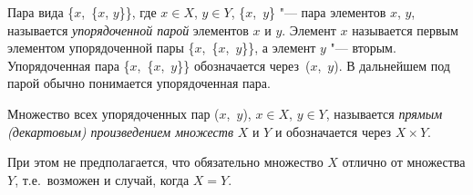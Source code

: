 \begin{defn}
Пара вида \{$x$,~\{$x$, $y$\}\}, где $x\in X$, $y\in Y$, \{$x$,~$y$\} "--- пара элементов $x$, $y$, называется \textit{упорядоченной парой} элементов $x$ и $y$. Элемент $x$ называется первым элементом упорядоченной пары \{$x$,~\{$x$,~$y$\}\}, а элемент $y$ "--- вторым. Упорядоченная пара \{$x$,~\{$x$,~$y$\}\} обозначается через~($x$,~$y$). В дальнейшем под парой обычно понимается упорядоченная пара.
\end{defn}

\begin{defn}
Множество всех упорядоченных пар ($x$,~$y$), $x\in X$, $y \in Y$, называется \textit{прямым (декартовым) произведением множеств} $X$ и $Y$ и обозначается через $X\times Y$. 
\end{defn}
При этом не предполагается, что обязательно множество $X$ отлично от множества $Y$, т.е.~возможен и случай, когда $X = Y$.